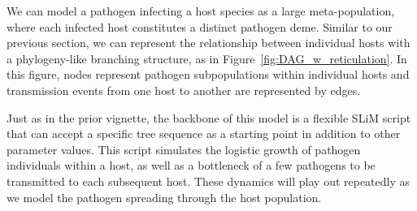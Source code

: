 \documentclass[12pt]{article}
\newcommand*{\ie}{i.e.\xcomma}
\begin{document}
We can model a pathogen infecting a host species as a large meta-population, where each infected host constitutes a distinct pathogen deme.
Similar to our previous section, we can represent the relationship between individual hosts with a phylogeny-like branching structure, as in Figure~\ref{fig:DAG_w_reticulation}.
In this figure, nodes represent pathogen subpopulations within individual hosts and transmission events from one host to another are represented by edges.

Just as in the prior vignette, the backbone of this model is a flexible SLiM script that can accept a specific tree sequence as a starting point in addition to other
parameter values.
This script simulates the logistic growth of pathogen individuals within a host,
as well as a bottleneck of a few pathogens to be transmitted to each subsequent host.
These dynamics will play out repeatedly as we model the pathogen
spreading through the host population.
\end{document}
